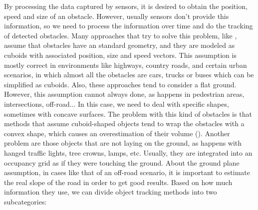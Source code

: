By processing the data captured by sensors, it is desired to obtain the position, speed and size of an obstacle. However, usually sensors don't provide this information, so we need to process the information over time and do the tracking of detected obstacles. Many approaches that try to solve this problem, like \cite{danescu2012particle}, assume that obstacles have an standard geometry, and they are modeled as cuboids with associated position, size and speed vectors. This assumption is mostly correct in environments like highways, country roads, and certain urban scenarios, in which almost all the obstacles are cars, trucks or buses which can be simplified as cuboids. Also, these approaches tend to consider a flat ground.
However, this assumption cannot always done, as happens in pedestrian areas, intersections, off-road... In this case, we need to deal with specific shapes, sometimes with concave surfaces. The problem with this kind of obstacles is that methods that assume cuboid-shaped objects tend to wrap the obstacles with a convex shape, which causes an overestimation of their volume (\cite{broggi2013}). Another problem are those objects that are not laying on the ground, as happens with hanged traffic lights, tree crowns, lamps, etc. Usually, they are integrated into an occupancy grid as if they were touching the ground. About the ground plane assumption, in cases like that of an off-road scenario, it is important to estimate the real slope of the road in order to get good results.
Based on how much information they use, we can divide object tracking methods into two subcategories:
